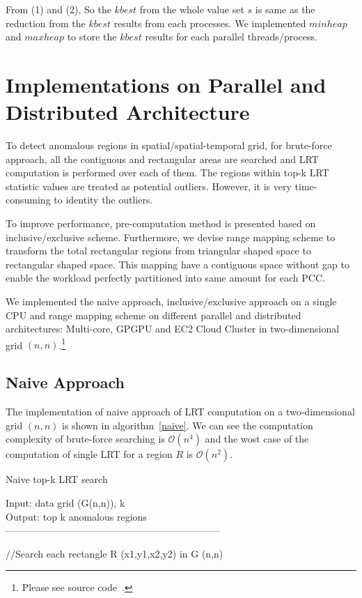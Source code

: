 \documentclass[AMA,LATO1COL]{WileyNJD-v2-bak}
\newcommand\bigo{\mathcal O}
\begin{document}
From (1) and (2), So the $kbest$ from the whole value set $s$ is same as the reduction from the $kbest$ results from each processes. We implemented $minheap$ and $maxheap$ to store the $kbest$ results for each parallel threads/process.

\section {Implementations on Parallel and Distributed Architecture }\label{IMPDA}
To detect anomalous regions in spatial/spatial-temporal grid, for brute-force approach, all the contiguous and rectangular areas are searched and LRT computation is performed over each of them. The regions within top-k LRT statistic values are treated as potential outliers. However, it is very time-consuming to identity the outliers.

To improve performance, pre-computation method is presented based on inclusive/exclusive scheme. Furthermore, we devise range mapping scheme to transform the total rectangular regions from triangular shaped space to rectangular shaped space. This mapping have a contiguous space without gap to enable the workload perfectly partitioned into same amount for each PCC.

We implemented the naive approach, inclusive/exclusive approach on a single CPU and range mapping scheme on different parallel and distributed architectures: Multi-core, GPGPU and EC2 Cloud Cluster in two-dimensional grid $(n,n)$.\footnote{Please see source code~\cite{lrtsrc}.}

\subsection{Naive Approach}
The implementation of naive approach of LRT computation on a two-dimensional grid $(n,n)$ is shown in algorithm~\ref{naive}. We can see the computation complexity of brute-force searching is $\bigo(n^4)$ and the wost case of the computation of single LRT for a region $R$ is $\bigo(n^2)$.

\begin{algorithm}[t!]
\label{algobr1}
\caption{Naive top-k LRT search}\label{naive}
Input: data grid (G(n,n)), k\\
Output: top k anomalous regions\\
------------------------------------------------------------------ \\
\begin{algorithmic}[1]
\State //Search each rectangle R (x1,y1,x2,y2) in G (n,n)
\EndFor
\EndFor
\EndFor
\EndFor
{}
\end{algorithmic}
\end{algorithm}
\end{document}

